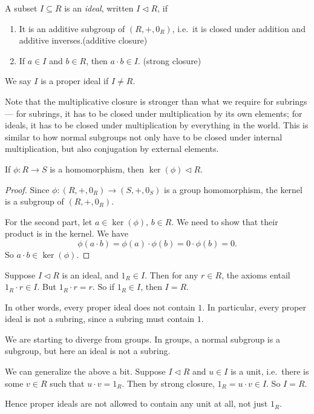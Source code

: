 \documentclass[a4paper]{article}
\begin{document}
\begin{defi}[Ideal]
  A subset $I \subseteq R$ is an \emph{ideal}, written $I \lhd R$, if
  \begin{enumerate}
    \item It is an additive subgroup of $(R, +, 0_R)$, i.e.\ it is closed under addition and additive inverses.\hfill (additive closure)
    \item If $a \in I$ and $b \in R$, then $a \cdot b \in I$. \hfill (strong closure)
  \end{enumerate}
  We say $I$ is a proper ideal if $I \not= R$.
\end{defi}
Note that the multiplicative closure is stronger than what we require for subrings --- for subrings, it has to be closed under multiplication by its own elements; for ideals, it has to be closed under multiplication by everything in the world. This is similar to how normal subgroups not only have to be closed under internal multiplication, but also conjugation by external elements.

\begin{lemma}
  If $\phi: R \to S$ is a homomorphism, then $\ker(\phi)\lhd R$.
\end{lemma}

\begin{proof}
  Since $\phi: (R, +, 0_R) \to (S, +, 0_S)$ is a group homomorphism, the kernel is a subgroup of $(R, +, 0_R)$.

  For the second part, let $a \in \ker(\phi)$, $b \in R$. We need to show that their product is in the kernel. We have
  \[
    \phi(a\cdot b) = \phi(a) \cdot \phi(b) = 0 \cdot \phi(b) = 0.
  \]
  So $a \cdot b \in \ker(\phi)$.
\end{proof}

\begin{eg}
  Suppose $I \lhd R$ is an ideal, and $1_R \in I$. Then for any $r \in R$, the axioms entail $1_R \cdot r \in I$. But $1_R \cdot r = r$. So if $1_R \in I$, then $I = R$.

  In other words, every proper ideal does not contain $1$. In particular, every proper ideal is not a subring, since a subring must contain $1$.
\end{eg}
We are starting to diverge from groups. In groups, a normal subgroup is a subgroup, but here an ideal is not a subring.

\begin{eg}
  We can generalize the above a bit. Suppose $I \lhd R$ and $u \in I$ is a unit, i.e.\ there is some $v \in R$ such that $u \cdot v = 1_R$. Then by strong closure, $1_R = u \cdot v\in I$. So $I = R$.

  Hence proper ideals are not allowed to contain any unit at all, not just $1_R$.
\end{eg}
\end{document}
